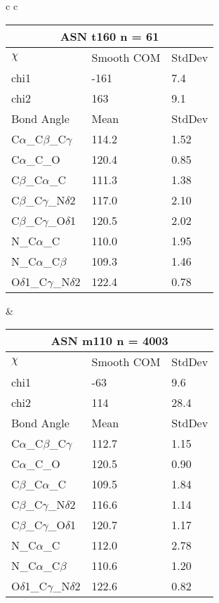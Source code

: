 \begin{longtable}{ c c }
  \\
  \begin{tabular}{ l l l }
  \toprule
  \multicolumn{3}{c}{ASN \textbf{t160} n = 61} \\ \toprule
  $\chi$       & Smooth COM & StdDev \\ \midrule
  chi1 & -161 & 7.4 \\ 
  chi2 & 163 & 9.1 \\ \midrule
  Bond Angle   & Mean     & StdDev \\ \midrule
  C$\alpha$\_C$\beta$\_C$\gamma$ & 114.2 & 1.52\\
  C$\alpha$\_C\_O & 120.4 & 0.85\\
  C$\beta$\_C$\alpha$\_C & 111.3 & 1.38\\
  C$\beta$\_C$\gamma$\_N$\delta$2 & 117.0 & 2.10\\
  C$\beta$\_C$\gamma$\_O$\delta$1 & 120.5 & 2.02\\
  N\_C$\alpha$\_C & 110.0 & 1.95\\
  N\_C$\alpha$\_C$\beta$ & 109.3 & 1.46\\
  O$\delta$1\_C$\gamma$\_N$\delta$2 & 122.4 & 0.78\\
  \bottomrule
  \end{tabular}
  &
  \begin{tabular}{ l l l }
  \toprule
  \multicolumn{3}{c}{ASN \textbf{m110} n = 4003} \\ \toprule
  $\chi$       & Smooth COM & StdDev \\ \midrule
  chi1 & -63 & 9.6 \\ 
  chi2 & 114 & 28.4 \\ \midrule
  Bond Angle   & Mean     & StdDev \\ \midrule
  C$\alpha$\_C$\beta$\_C$\gamma$ & 112.7 & 1.15\\
  C$\alpha$\_C\_O & 120.5 & 0.90\\
  C$\beta$\_C$\alpha$\_C & 109.5 & 1.84\\
  C$\beta$\_C$\gamma$\_N$\delta$2 & 116.6 & 1.14\\
  C$\beta$\_C$\gamma$\_O$\delta$1 & 120.7 & 1.17\\
  N\_C$\alpha$\_C & 112.0 & 2.78\\
  N\_C$\alpha$\_C$\beta$ & 110.6 & 1.20\\
  O$\delta$1\_C$\gamma$\_N$\delta$2 & 122.6 & 0.82\\
  \bottomrule
  \end{tabular}
  \\
  \begin{tabular}{ l l l }

\end{tabular}
\end{longtable}

